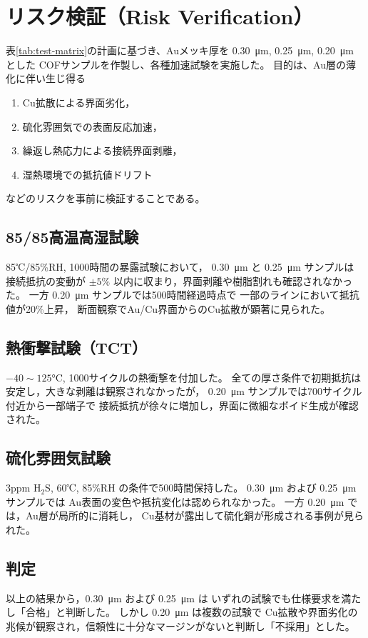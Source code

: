 \documentclass[conference]{IEEEtran}
\begin{document}
\section{リスク検証（Risk Verification）}

表\ref{tab:test-matrix}の計画に基づき、Auメッキ厚を
\SI{0.30}{\micro\meter}, \SI{0.25}{\micro\meter}, \SI{0.20}{\micro\meter} とした
COFサンプルを作製し、各種加速試験を実施した。
目的は、Au層の薄化に伴い生じ得る
\begin{enumerate}
  \item Cu拡散による界面劣化，
  \item 硫化雰囲気での表面反応加速，
  \item 繰返し熱応力による接続界面剥離，
  \item 湿熱環境での抵抗値ドリフト
\end{enumerate}
などのリスクを事前に検証することである。

\subsection*{85/85高温高湿試験}
85℃/85\%RH, 1000時間の暴露試験において，
\SI{0.30}{\micro\meter} と \SI{0.25}{\micro\meter} サンプルは
接続抵抗の変動が $\pm5\%$ 以内に収まり，界面剥離や樹脂割れも確認されなかった。
一方 \SI{0.20}{\micro\meter} サンプルでは500時間経過時点で
一部のラインにおいて抵抗値が20\%上昇，
断面観察でAu/Cu界面からのCu拡散が顕著に見られた。

\subsection*{熱衝撃試験（TCT）}
$-40 \sim 125$\si{\celsius}, 1000サイクルの熱衝撃を付加した。
全ての厚さ条件で初期抵抗は安定し，大きな剥離は観察されなかったが，
\SI{0.20}{\micro\meter} サンプルでは700サイクル付近から一部端子で
接続抵抗が徐々に増加し，界面に微細なボイド生成が確認された。

\subsection*{硫化雰囲気試験}
3ppm H$_2$S, 60℃, 85\%RH の条件で500時間保持した。
\SI{0.30}{\micro\meter} および \SI{0.25}{\micro\meter} サンプルでは
Au表面の変色や抵抗変化は認められなかった。
一方 \SI{0.20}{\micro\meter} では，Au層が局所的に消耗し，
Cu基材が露出して硫化銅が形成される事例が見られた。

\subsection*{判定}
以上の結果から，\SI{0.30}{\micro\meter} および \SI{0.25}{\micro\meter} は
いずれの試験でも仕様要求を満たし「合格」と判断した。
しかし \SI{0.20}{\micro\meter} は複数の試験で
Cu拡散や界面劣化の兆候が観察され，信頼性に十分なマージンがないと判断し「不採用」とした。
\end{document}
